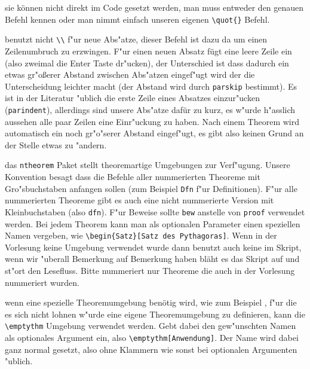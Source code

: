 \documentclass[paper=A4, twoside, chapterprefix=true, bibliography=totoc, headsepline]{scrbook}
\begin{document}
\begin{description}[font=\normalfont\itshape]
\item[Anf"uhrungszeichen:]
	sie können nicht direkt im Code gesetzt werden, man muss entweder den genauen Befehl kennen oder man nimmt einfach unseren eigenen \verb|\quot{}| Befehl.
\item[Abs"atze:]
	benutzt nicht \verb|\\| f"ur neue Abs"atze, dieser Befehl ist dazu da um einen Zeilenumbruch zu erzwingen. F"ur einen neuen Absatz fügt eine leere Zeile ein (also zweimal die Enter Taste dr"ucken), der Unterschied ist dass dadurch ein etwas gr"o\ss erer Abstand zwischen Abs"atzen eingef"ugt wird der die Unterscheidung leichter macht (der Abstand wird durch \verb|parskip| bestimmt). Es ist in der Literatur "ublich die erste Zeile eines Absatzes einzur"ucken (\verb|parindent|), allerdings sind unsere Abs"atze dafür zu kurz, es w"urde h"asslich aussehen alle paar Zeilen eine Einr"uckung zu haben. Nach einem Theorem wird automatisch ein noch gr"o"serer Abstand eingef"ugt, es gibt also keinen Grund an der Stelle etwas zu "andern.
\item[Theoreme:]
	das \verb|ntheorem| Paket stellt theoremartige Umgebungen zur Verf"ugung. Unsere Konvention besagt dass die Befehle aller nummerierten Theoreme mit Gro"sbuchstaben anfangen sollen (zum Beispiel \verb|Dfn| f"ur Definitionen). F"ur alle nummerierten Theoreme gibt es auch eine nicht nummerierte Version mit Kleinbuchstaben (also \verb|dfn|). F"ur Beweise sollte \verb|bew| anstelle von \verb|proof| verwendet werden. Bei jedem Theorem kann man als optionalen Parameter einen speziellen Namen vergeben, wie \verb|\begin{Satz}[Satz des Pythagoras]|. Wenn in der Vorlesung keine Umgebung verwendet wurde dann benutzt auch keine im Skript, wenn wir "uberall Bemerkung auf Bemerkung haben bläht es das Skript auf und st"ort den Lesefluss. Bitte nummeriert nur Theoreme die auch in der Vorlesung nummeriert wurden.
\item[Spezielle Theoreme:]
	wenn eine spezielle Theoremumgebung benötig wird, wie zum Beispiel , f"ur die es sich nicht lohnen w"urde eine eigene Theoremumgebung zu definieren, kann die \verb|\emptythm| Umgebung verwendet werden. Gebt dabei den gew"unschten Namen als optionales Argument ein, also \verb|\emptythm[Anwendung]|. Der Name wird dabei ganz normal gesetzt, also ohne Klammern wie sonst bei optionalen Argumenten "ublich.
\item[Listen und Aufz"ahlungen:]

\end{description}
\end{document}
